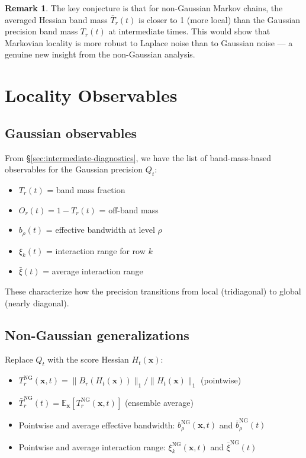 \documentclass[11pt,a4paper]{article}
\theoremstyle{plain}
\theoremstyle{definition}
\newtheorem{remark}[theorem]{Remark}
\newcommand{\Prec}{Q}
\newcommand{\vct}[1]{\mathbf{#1}}
\begin{document}
\begin{remark}
The key conjecture is that for non-Gaussian Markov chains, the averaged Hessian band mass $\bar{T}_r(t)$ is closer to 1 (more local) than the Gaussian precision band mass $T_r(t)$ at intermediate times. This would show that Markovian locality is more robust to Laplace noise than to Gaussian noise — a genuine new insight from the non-Gaussian analysis.
\end{remark}

\section{Locality Observables}
\label{sec:observables}

\subsection{Gaussian observables}
\label{sec:gauss-obs}

From \S\ref{sec:intermediate-diagnostics}, we have the list of band-mass-based observables for the Gaussian precision $\Prec_t$:

\begin{itemize}
\item $T_r(t)$ = band mass fraction
\item $O_r(t) = 1 - T_r(t)$ = off-band mass
\item $b_\rho(t)$ = effective bandwidth at level $\rho$
\item $\xi_k(t)$ = interaction range for row $k$
\item $\bar{\xi}(t)$ = average interaction range
\end{itemize}

These characterize how the precision transitions from local (tridiagonal) to global (nearly diagonal).

\subsection{Non-Gaussian generalizations}
\label{sec:non-gauss-obs}

Replace $\Prec_t$ with the score Hessian $H_t(\vct{x})$:

\begin{itemize}
\item $T_r^{\text{NG}}(\vct{x}, t) = \|B_r(H_t(\vct{x}))\|_1 / \|H_t(\vct{x})\|_1$ (pointwise)
\item $\bar{T}_r^{\text{NG}}(t) = \mathbb{E}_{\vct{x}}[T_r^{\text{NG}}(\vct{x}, t)]$ (ensemble average)
\item Pointwise and average effective bandwidth: $b_\rho^{\text{NG}}(\vct{x}, t)$ and $\bar{b}_\rho^{\text{NG}}(t)$
\item Pointwise and average interaction range: $\xi_k^{\text{NG}}(\vct{x}, t)$ and $\bar{\xi}^{\text{NG}}(t)$
\end{itemize}
\end{document}
